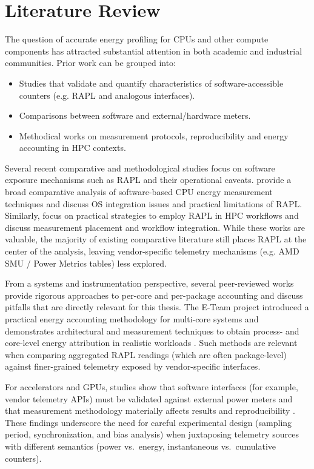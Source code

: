 \section{Literature Review}

The question of accurate energy profiling for \gls{CPU}s and other compute
components has attracted substantial attention in both academic and
industrial communities. Prior work can be grouped into:
\begin{itemize}
  \item Studies that validate and quantify characteristics of
    software-accessible counters (e.g. \gls{RAPL} and analogous interfaces).
  \item Comparisons between software and external/hardware meters.
  \item Methodical works on measurement protocols, reproducibility and energy
    accounting in \gls{HPC} contexts.
\end{itemize}

Several recent comparative and methodological studies focus on software
exposure mechanisms such as \gls{RAPL} and their operational caveats.
\textcite{SoftMeasComp} provide a broad comparative analysis of
software-based \gls{CPU} energy measurement techniques and discuss OS
integration issues and practical limitations of \gls{RAPL}. Similarly,
\textcite{RAPL_Strategies} focus on practical strategies to employ
\gls{RAPL} in \gls{HPC} workflows and discuss measurement placement and workflow
integration. While these works are valuable, the majority of existing
comparative literature still places \gls{RAPL} at the center of the analysis,
leaving vendor-specific telemetry mechanisms (e.g. AMD \gls{SMU} / Power Metrics
tables) less explored.

From a systems and instrumentation perspective, several peer-reviewed
works provide rigorous approaches to per-core and per-package accounting
and discuss pitfalls that are directly relevant for this thesis. The
E-Team project introduced a practical energy accounting methodology for
multi-core systems and demonstrates architectural and measurement
techniques to obtain process- and core-level energy attribution in
realistic workloads \parencite{ETeam_2017}. Such methods are relevant
when comparing aggregated \gls{RAPL} readings (which are often package-level)
against finer-grained telemetry exposed by vendor-specific interfaces.

For accelerators and \gls{GPU}s, studies show that software interfaces (for
example, vendor telemetry APIs) must be validated against external
power meters and that measurement methodology materially affects
results and reproducibility \parencite{You_2023_Zeus}. These findings
underscore the need for careful experimental design (sampling period,
synchronization, and bias analysis) when juxtaposing telemetry sources
with different semantics (power vs.\ energy, instantaneous vs.\
cumulative counters).

